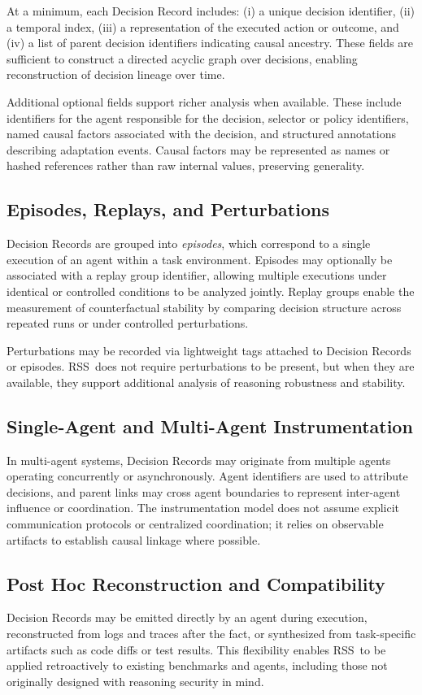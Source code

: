\documentclass[11pt]{article}
\newcommand{\RSS}{\textsc{RSS}}
\begin{document}
At a minimum, each Decision Record includes: (i) a unique decision identifier, (ii) a temporal index, (iii) a representation of the executed action or outcome, and (iv) a list of parent decision identifiers indicating causal ancestry. These fields are sufficient to construct a directed acyclic graph over decisions, enabling reconstruction of decision lineage over time.

Additional optional fields support richer analysis when available. These include identifiers for the agent responsible for the decision, selector or policy identifiers, named causal factors associated with the decision, and structured annotations describing adaptation events. Causal factors may be represented as names or hashed references rather than raw internal values, preserving generality.

\subsection{Episodes, Replays, and Perturbations}
Decision Records are grouped into \emph{episodes}, which correspond to a single execution of an agent within a task environment. Episodes may optionally be associated with a replay group identifier, allowing multiple executions under identical or controlled conditions to be analyzed jointly. Replay groups enable the measurement of counterfactual stability by comparing decision structure across repeated runs or under controlled perturbations.

Perturbations may be recorded via lightweight tags attached to Decision Records or episodes. \RSS\ does not require perturbations to be present, but when they are available, they support additional analysis of reasoning robustness and stability.

\subsection{Single-Agent and Multi-Agent Instrumentation}
In multi-agent systems, Decision Records may originate from multiple agents operating concurrently or asynchronously. Agent identifiers are used to attribute decisions, and parent links may cross agent boundaries to represent inter-agent influence or coordination. The instrumentation model does not assume explicit communication protocols or centralized coordination; it relies on observable artifacts to establish causal linkage where possible.

\subsection{Post Hoc Reconstruction and Compatibility}
Decision Records may be emitted directly by an agent during execution, reconstructed from logs and traces after the fact, or synthesized from task-specific artifacts such as code diffs or test results. This flexibility enables \RSS\ to be applied retroactively to existing benchmarks and agents, including those not originally designed with reasoning security in mind.
\end{document}
